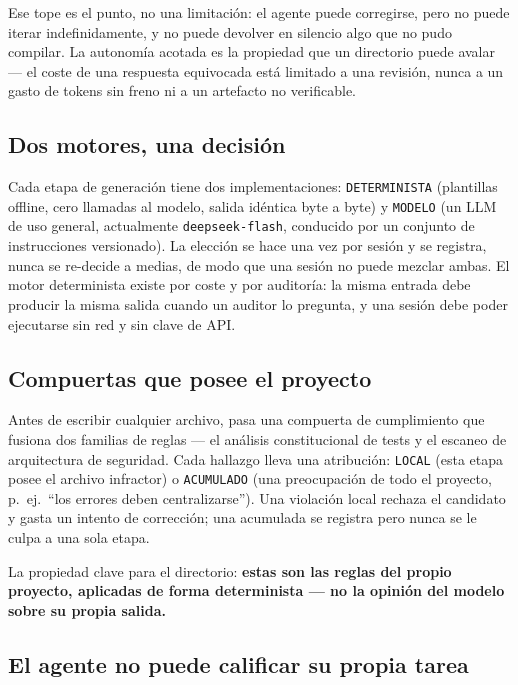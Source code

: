 \documentclass[11pt,a4paper]{article}
\begin{document}
Ese tope es el punto, no una limitación: el agente puede corregirse, pero no puede
iterar indefinidamente, y no puede devolver en silencio algo que no pudo compilar. La
autonomía acotada es la propiedad que un directorio puede avalar --- el coste de una
respuesta equivocada está limitado a una revisión, nunca a un gasto de tokens sin
freno ni a un artefacto no verificable.

\subsection{Dos motores, una decisión}

Cada etapa de generación tiene dos implementaciones: \texttt{DETERMINISTA} (plantillas
offline, cero llamadas al modelo, salida idéntica byte a byte) y \texttt{MODELO} (un
LLM de uso general, actualmente \texttt{deepseek-flash}, conducido por un conjunto de
instrucciones versionado). La elección se hace una vez por sesión y se registra, nunca
se re-decide a medias, de modo que una sesión no puede mezclar ambas. El motor
determinista existe por coste y por auditoría: la misma entrada debe producir la misma
salida cuando un auditor lo pregunta, y una sesión debe poder ejecutarse sin red y sin
clave de API.

\subsection{Compuertas que posee el proyecto}

Antes de escribir cualquier archivo, pasa una compuerta de cumplimiento que fusiona
dos familias de reglas --- el análisis constitucional de tests y el escaneo de
arquitectura de seguridad. Cada hallazgo lleva una atribución: \texttt{LOCAL} (esta
etapa posee el archivo infractor) o \texttt{ACUMULADO} (una preocupación de todo el
proyecto, p.\ ej.\ ``los errores deben centralizarse''). Una violación local rechaza
el candidato y gasta un intento de corrección; una acumulada se registra pero nunca se
le culpa a una sola etapa.

La propiedad clave para el directorio: \textbf{estas son las reglas del propio
proyecto, aplicadas de forma determinista --- no la opinión del modelo sobre su propia
salida.}

\subsection{El agente no puede calificar su propia tarea}
\end{document}
